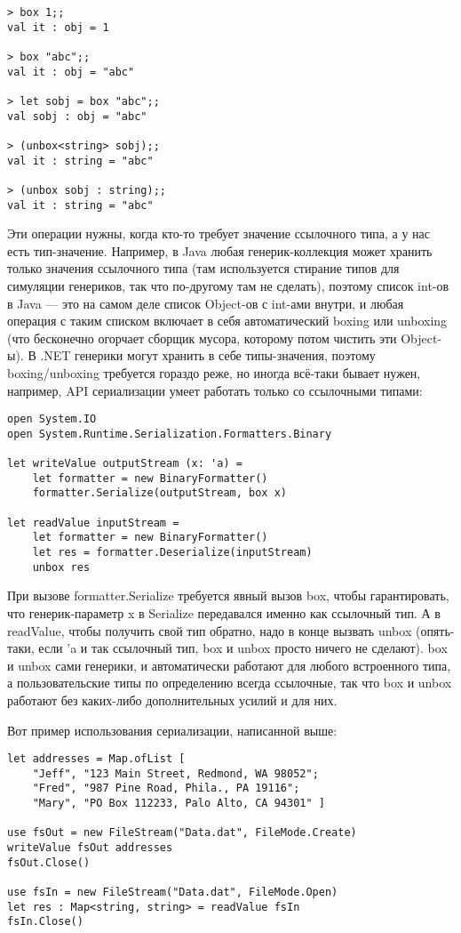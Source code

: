 \documentclass{../../text-style}
\begin{document}
\begin{verbatim}
> box 1;;
val it : obj = 1

> box "abc";;
val it : obj = "abc"

> let sobj = box "abc";;
val sobj : obj = "abc"

> (unbox<string> sobj);;
val it : string = "abc"

> (unbox sobj : string);;
val it : string = "abc"
\end{verbatim}

Эти операции нужны, когда кто-то требует значение ссылочного типа, а у нас есть тип-значение. Например, в Java любая генерик-коллекция может хранить только значения ссылочного типа (там используется стирание типов для симуляции генериков, так что по-другому там не сделать), поэтому список int-ов в Java --- это на самом деле список Object-ов с int-ами внутри, и любая операция с таким списком включает в себя автоматический boxing или unboxing (что бесконечно огорчает сборщик мусора, которому потом чистить эти Object-ы). В .NET генерики могут хранить в себе типы-значения, поэтому boxing/unboxing требуется гораздо реже, но иногда всё-таки бывает нужен, например, API сериализации умеет работать только со ссылочными типами:

\begin{verbatim}
open System.IO
open System.Runtime.Serialization.Formatters.Binary

let writeValue outputStream (x: 'a) =
    let formatter = new BinaryFormatter()
    formatter.Serialize(outputStream, box x)

let readValue inputStream =
    let formatter = new BinaryFormatter()
    let res = formatter.Deserialize(inputStream)
    unbox res
\end{verbatim}

При вызове formatter.Serialize требуется явный вызов box, чтобы гарантировать, что генерик-параметр x в Serialize передавался именно как ссылочный тип. А в readValue, чтобы получить свой тип обратно, надо в конце вызвать unbox (опять-таки, если 'a и так ссылочный тип, box и unbox просто ничего не сделают). box и unbox сами генерики, и автоматически работают для любого встроенного типа, а пользовательские типы по определению всегда ссылочные, так что box и unbox работают без каких-либо дополнительных усилий и для них.

Вот пример использования сериализации, написанной выше:

\begin{verbatim}
let addresses = Map.ofList [ 
    "Jeff", "123 Main Street, Redmond, WA 98052";
    "Fred", "987 Pine Road, Phila., PA 19116";
    "Mary", "PO Box 112233, Palo Alto, CA 94301" ]

use fsOut = new FileStream("Data.dat", FileMode.Create)
writeValue fsOut addresses
fsOut.Close()

use fsIn = new FileStream("Data.dat", FileMode.Open)
let res : Map<string, string> = readValue fsIn
fsIn.Close()
\end{verbatim}
\end{document}
